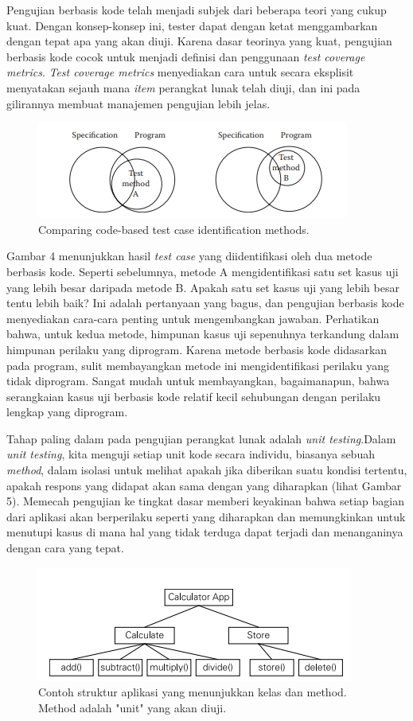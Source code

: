 \documentclass[a4paper,twoside]{article}
\begin{document}
\begin{enumerate}
Pengujian berbasis kode telah menjadi subjek dari beberapa teori yang cukup kuat. Dengan konsep-konsep ini, tester dapat dengan ketat menggambarkan dengan tepat apa yang akan diuji. Karena dasar teorinya yang kuat, pengujian berbasis kode cocok untuk menjadi definisi dan penggunaan \textit{test coverage metrics}. \textit{Test coverage metrics} menyediakan cara untuk secara eksplisit menyatakan sejauh mana \textit{item} perangkat lunak telah diuji, dan ini pada gilirannya membuat manajemen pengujian lebih jelas.
\begin{figure}[h!]
 \includegraphics[scale=1.2]{../DokumenSkripsi/gambar/compareAB-whitebox}
 \centering
 \caption{Comparing code-based test case identification methods.}
\end{figure}
Gambar 4 menunjukkan hasil \textit{test case} yang diidentifikasi oleh dua metode berbasis kode. Seperti sebelumnya, metode A mengidentifikasi satu set kasus uji yang lebih besar daripada metode B. Apakah satu set kasus uji yang lebih besar tentu lebih baik? Ini adalah pertanyaan yang bagus, dan pengujian berbasis kode menyediakan cara-cara penting untuk mengembangkan jawaban. Perhatikan bahwa, untuk kedua metode, himpunan kasus uji sepenuhnya terkandung dalam himpunan perilaku yang diprogram. Karena metode berbasis kode didasarkan pada program, sulit membayangkan metode ini mengidentifikasi perilaku yang tidak diprogram. Sangat mudah untuk membayangkan, bagaimanapun, bahwa serangkaian kasus uji berbasis kode relatif kecil sehubungan dengan perilaku lengkap yang diprogram. 

Tahap paling dalam pada pengujian perangkat lunak adalah \textit{unit testing}.Dalam \textit{unit testing}, kita menguji setiap unit kode secara individu, biasanya sebuah \textit{method}, dalam isolasi untuk melihat apakah jika diberikan suatu kondisi tertentu, apakah respons yang didapat akan sama dengan yang diharapkan (lihat Gambar 5). Memecah pengujian ke tingkat dasar memberi keyakinan bahwa setiap bagian dari aplikasi akan berperilaku seperti yang diharapkan dan memungkinkan untuk menutupi kasus di mana hal yang tidak terduga dapat terjadi dan menanganinya dengan cara yang tepat.
\begin{figure}[h!]
	\includegraphics[scale=1.5]{../DokumenSkripsi/gambar/unittest}
	\centering
	\caption{Contoh struktur aplikasi yang menunjukkan kelas dan method. Method adalah "unit" yang akan diuji.}
\end{figure}


\end{enumerate}
\end{document}
